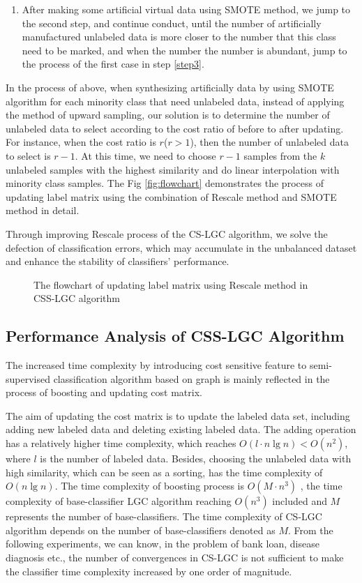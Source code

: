 \documentclass{svjour3}                     %
\begin{document}
\begin{enumerate}[1)]
\item After making some artificial virtual data using SMOTE method, we jump to the second step, and continue conduct, until the number of artificially manufactured unlabeled data is more closer to
the number that this class need to be marked, and when the number the number is abundant, jump to the process of the first case in step \ref{step3}.

\end{enumerate}

In the process of above, when synthesizing artificially data by using SMOTE algorithm for each minority class that need unlabeled data, instead of applying the method of upward sampling, our solution is to determine the number of unlabeled data to select according to the cost ratio of before  to after updating. For instance, when the cost ratio is $r$($r>1$), then the number of unlabeled data to select is $r-1$. At this time, we need to choose $r-1$ samples from the $k$ unlabeled samples with the highest similarity and do linear interpolation with minority class samples. The Fig \ref{fig:flowchart} demonstrates the process of updating label matrix using the combination of Rescale method and SMOTE method in detail.

Through improving Rescale process of the CS-LGC algorithm, we solve the defection of classification errors, which may accumulate in the unbalanced dataset and enhance the stability of classifiers' performance.
\begin{figure}[ht]

\caption{The flowchart of updating label matrix using Rescale method in CSS-LGC algorithm}
\end{figure}
\label{fig:flowchart}
\subsection{Performance Analysis of CSS-LGC Algorithm}
The increased time complexity by introducing cost sensitive feature to semi-supervised classification algorithm based on graph is mainly reflected in the process of boosting and updating cost matrix.

The aim of updating the cost matrix is to update the labeled data set, including adding new labeled data and deleting existing labeled data. The adding operation has a relatively higher time complexity, which reaches $O(l \cdot n\lg n) < O({n^2}) $, where $l$ is the number of labeled data. Besides, choosing the unlabeled data with high similarity, which can be seen as a sorting, has the time complexity of $O(n\lg n)$. The time complexity of boosting process is $O(M \cdot {n^3})$ ,  the time complexity of base-classifier LGC algorithm reaching $O({n^3})$ included and $M$ represents the number of base-classifiers. The time complexity of CS-LGC algorithm depends on the number of base-classifiers denoted as $M$. From the following experiments, we can know, in the problem of bank loan, disease diagnosis etc., the number of convergences in CS-LGC is not sufficient to make the classifier time complexity increased by one order of magnitude.
\end{document}
